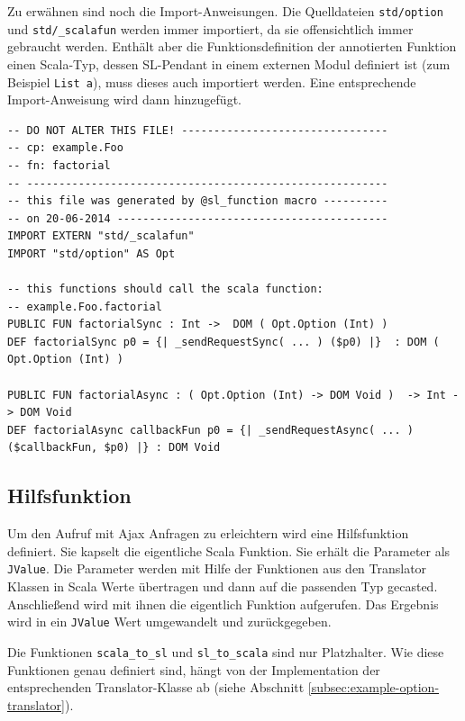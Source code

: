 \documentclass[12pt,bibtotoc]{scrreprt}
\begin{document}
Zu erwähnen sind noch die Import-Anweisungen. Die Quelldateien \lstinline!std/option! und \lstinline!std/_scalafun! werden immer importiert, da sie offensichtlich immer gebraucht werden. Enthält aber die Funktionsdefinition der annotierten Funktion einen Scala-Typ, dessen SL-Pendant in einem externen Modul definiert ist (zum Beispiel \lstinline!List a!), muss dieses auch importiert werden. Eine entsprechende Import-Anweisung wird dann hinzugefügt.

\begin{lstlisting}[caption=SL-Modul factorial.sl zur Funktion aus Listing \ref{lst:example-function}, label=lst:example-sl-modul, float=h]
-- DO NOT ALTER THIS FILE! --------------------------------
-- cp: example.Foo
-- fn: factorial
-- --------------------------------------------------------
-- this file was generated by @sl_function macro ----------
-- on 20-06-2014 ------------------------------------------
IMPORT EXTERN "std/_scalafun"
IMPORT "std/option" AS Opt

-- this functions should call the scala function:
-- example.Foo.factorial
PUBLIC FUN factorialSync : Int ->  DOM ( Opt.Option (Int) )
DEF factorialSync p0 = {| _sendRequestSync( ... ) ($p0) |}  : DOM ( Opt.Option (Int) )

PUBLIC FUN factorialAsync : ( Opt.Option (Int) -> DOM Void )  -> Int -> DOM Void
DEF factorialAsync callbackFun p0 = {| _sendRequestAsync( ... )  ($callbackFun, $p0) |} : DOM Void
\end{lstlisting}

\subsection{Hilfsfunktion}
\label{subsec:helperfunction}

Um den Aufruf mit Ajax Anfragen zu erleichtern wird eine Hilfsfunktion definiert. Sie kapselt die eigentliche Scala Funktion. Sie erhält die Parameter als \lstinline!JValue!. Die Parameter werden mit Hilfe der Funktionen aus den Translator Klassen in Scala Werte übertragen und dann auf die passenden Typ gecasted. Anschließend wird mit ihnen die eigentlich Funktion aufgerufen. Das Ergebnis wird in ein \lstinline!JValue! Wert umgewandelt und zurückgegeben.

Die Funktionen \lstinline!scala_to_sl! und \lstinline!sl_to_scala! sind nur Platzhalter. Wie diese Funktionen genau definiert sind, hängt von der Implementation der entsprechenden Translator-Klasse ab (siehe Abschnitt \ref{subsec:example-option-translator}).
\end{document}
